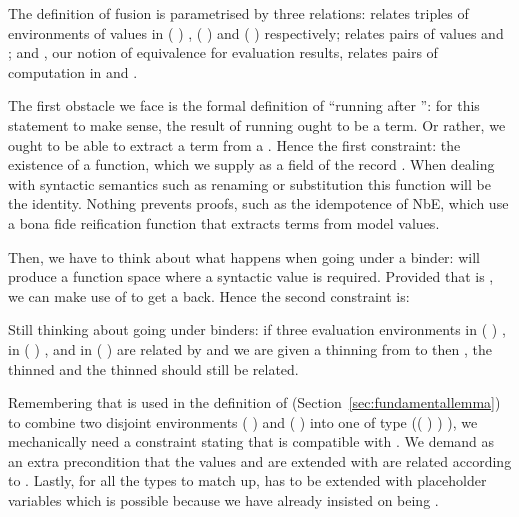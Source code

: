 The definition of fusion is parametrised by three relations:  relates
triples of environments of values in {( )  },
{( )  } and {( )  }
respectively;  relates pairs of values  and ;
and , our notion of equivalence for evaluation results, relates pairs
of computation in  and .

\begin{agdasnippet}
\end{agdasnippet}
The first obstacle we face is the formal definition of ``running 
after '': for this statement to make sense, the result of running
 ought to be a term. Or rather, we ought to be able to extract a
term from a . Hence the first constraint: the existence of a 
function, which we supply as a field of the record . When dealing with
syntactic semantics such as renaming or substitution
this function will be the identity. Nothing prevents proofs, such as the
idempotence of NbE, which use a bona fide reification function that extracts
terms from model values.

\begin{agdasnippet}
\addtolength{\leftskip}{\parindent}
\end{agdasnippet}
Then, we have to think about what happens when going under a binder: 
will produce a  function space where a syntactic
value is required. Provided that  is , we can make use of 
to get a  back. Hence the second constraint is:

\begin{agdasnippet}
\addtolength{\leftskip}{\parindent}
\end{agdasnippet}
Still thinking about going under binders: if three evaluation environments
 in {( )  },  in
{( )  }, and  in {( )  }
are related by  and we are given a thinning  from  to 
then , the thinned  and the thinned  should still be related.

\begin{agdasnippet}
\addtolength{\leftskip}{\parindent}
\end{agdasnippet}
Remembering that \AF{\_>>\_} is used in the definition of  (Section~\ref{sec:fundamentallemma}) to
combine two disjoint environments {( )  } and
{( )  } into one of type
{(( \AF{++} ) )  )}, we mechanically need a
constraint stating that \AF{\_>>\_} is compatible with . We demand
as an extra precondition that the values  and  are extended
with are related according to . Lastly, for all the types to match up,
 has to be extended with placeholder variables which is possible because
we have already insisted on  being .

